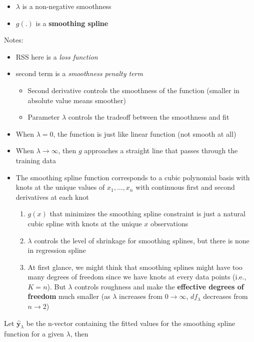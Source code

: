 \documentclass[
]{book}
\begin{document}
\begin{itemize}
\item
  \(\lambda\) is a non-negative smoothness
\item
  \(g(.)\) is a \textbf{smoothing spline}
\end{itemize}

Notes:

\begin{itemize}
\item
  RSS here is a \emph{loss function}
\item
  second term is a \emph{smoothness penalty term}

  \begin{itemize}
  \item
    Second derivative controls the smoothness of the function (smaller in absolute value means smoother)
  \item
    Parameter \(\lambda\) controls the tradeoff between the smoothness and fit
  \end{itemize}
\item
  When \(\lambda =0\), the function is just like linear function (not smooth at all)
\item
  When \(\lambda \to \infty\), then \(g\) approaches a straight line that passes through the training data
\item
  The smoothing spline function corresponds to a cubic polynomial basis with knots at the unique values of \(x_1, \dots, x_n\) with continuous first and second derivatives at each knot

  \begin{enumerate}
  \def\labelenumi{\arabic{enumi}.}
  \item
    \(g(x)\) that minimizes the smoothing spline constraint is just a natural cubic spline with knots at the unique \(x\) observations
  \item
    \(\lambda\) controls the level of shrinkage for smoothing splines, but there is none in regression spline
  \item
    At first glance, we might think that smoothing splines might have too many degrees of freedom since we have knots at every data points (i.e., \(K = n\)). But \(\lambda\) controls roughness and make the \textbf{effective degrees of freedom} much smaller (as \(\lambda\) increases from \(0 \to \infty\), \(df_\lambda\) decreases from \(n \to 2\))
  \end{enumerate}
\end{itemize}

Let \(\hat{\mathbf{y}}_\lambda\) be the n-vector containing the fitted values for the smoothing spline function for a given \(\lambda\), then
\end{document}
